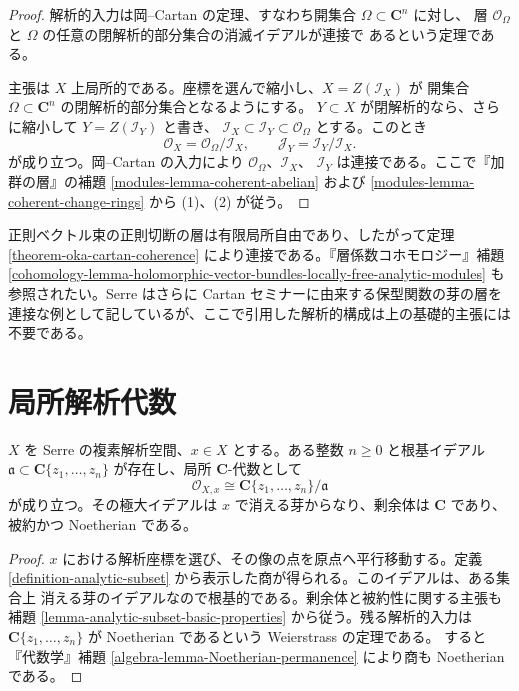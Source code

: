 \begin{proof}
解析的入力は岡--Cartan の定理、すなわち開集合 $\Omega\subset\mathbf C^n$ に対し、
層 $\mathcal O_\Omega$ と $\Omega$ の任意の閉解析的部分集合の消滅イデアルが連接で
あるという定理である。

主張は $X$ 上局所的である。座標を選んで縮小し、$X=Z(\mathcal I_X)$ が
開集合 $\Omega\subset\mathbf C^n$ の閉解析的部分集合となるようにする。
$Y\subset X$ が閉解析的なら、さらに縮小して $Y=Z(\mathcal I_Y)$ と書き、
$\mathcal I_X\subset\mathcal I_Y\subset\mathcal O_\Omega$ とする。このとき
$$
\mathcal O_X=\mathcal O_\Omega/\mathcal I_X,
\qquad
\mathcal J_Y=\mathcal I_Y/\mathcal I_X.
$$
が成り立つ。岡--Cartan の入力により $\mathcal O_\Omega$、$\mathcal I_X$、
$\mathcal I_Y$ は連接である。ここで『加群の層』の補題
\ref{modules-lemma-coherent-abelian} および
\ref{modules-lemma-coherent-change-rings} から (1)、(2) が従う。
\end{proof}

\begin{remark}[例]
\label{remark-examples-coherent-analytic-modules}
正則ベクトル束の正則切断の層は有限局所自由であり、したがって定理
\ref{theorem-oka-cartan-coherence} により連接である。『層係数コホモロジー』補題
\ref{cohomology-lemma-holomorphic-vector-bundles-locally-free-analytic-modules}
も参照されたい。Serre はさらに Cartan セミナーに由来する保型関数の芽の層を
連接な例として記しているが、ここで引用した解析的構成は上の基礎的主張には不要である。
\end{remark}


\section{局所解析代数}
\label{section-local-analytic-algebras}

\begin{lemma}
\label{lemma-local-analytic-algebra}
\begin{reference}
\cite[\S 1、第4項、6頁]{GAGA}
\end{reference}
$X$ を Serre の複素解析空間、$x\in X$ とする。ある整数 $n\geq 0$ と根基イデアル
$\mathfrak a\subset\mathbf C\{z_1,\ldots,z_n\}$ が存在し、局所 $\mathbf C$-代数として
$$
\mathcal O_{X,x}\cong
\mathbf C\{z_1,\ldots,z_n\}/\mathfrak a
$$
が成り立つ。その極大イデアルは
$x$ で消える芽からなり、剰余体は $\mathbf C$ であり、被約かつ Noetherian である。
\end{lemma}

\begin{proof}
$x$ における解析座標を選び、その像の点を原点へ平行移動する。定義
\ref{definition-analytic-subset} から表示した商が得られる。このイデアルは、ある集合上
消える芽のイデアルなので根基的である。剰余体と被約性に関する主張も補題
\ref{lemma-analytic-subset-basic-properties} から従う。残る解析的入力は
$\mathbf C\{z_1,\ldots,z_n\}$ が Noetherian であるという Weierstrass の定理である。
すると『代数学』補題 \ref{algebra-lemma-Noetherian-permanence} により商も
Noetherian である。
\end{proof}

